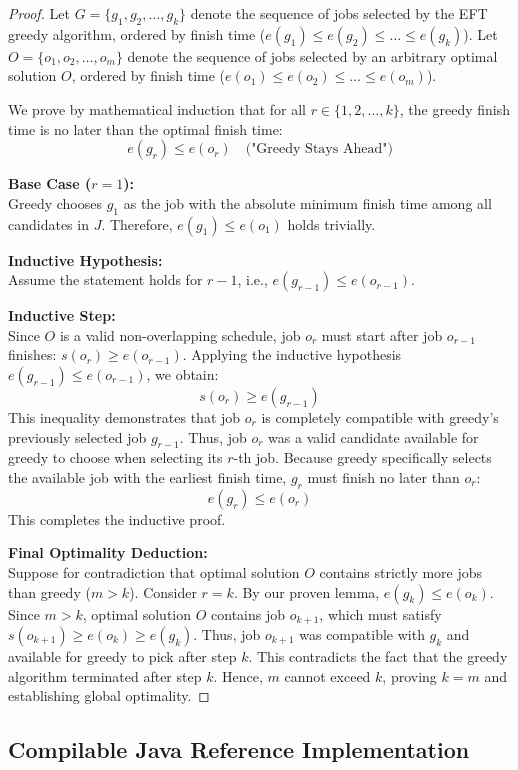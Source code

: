 \documentclass[10pt,journal,compsoc,onecolumn]{IEEEtran}
\begin{document}
\begin{proof}
Let $G = \{g_1, g_2, \dots, g_k\}$ denote the sequence of jobs selected by the EFT greedy algorithm, ordered by finish time ($e(g_1) \le e(g_2) \le \dots \le e(g_k)$).
Let $O = \{o_1, o_2, \dots, o_m\}$ denote the sequence of jobs selected by an arbitrary optimal solution $O$, ordered by finish time ($e(o_1) \le e(o_2) \le \dots \le e(o_m)$).

We prove by mathematical induction that for all $r \in \{1, 2, \dots, k\}$, the greedy finish time is no later than the optimal finish time:
\[
e(g_r) \le e(o_r) \quad \text{("Greedy Stays Ahead")}
\]

\textbf{Base Case ($r = 1$):} \\
Greedy chooses $g_1$ as the job with the absolute minimum finish time among all candidates in $J$. Therefore, $e(g_1) \le e(o_1)$ holds trivially.

\textbf{Inductive Hypothesis:} \\
Assume the statement holds for $r - 1$, i.e., $e(g_{r-1}) \le e(o_{r-1})$.

\textbf{Inductive Step:} \\
Since $O$ is a valid non-overlapping schedule, job $o_r$ must start after job $o_{r-1}$ finishes: $s(o_r) \ge e(o_{r-1})$.
Applying the inductive hypothesis $e(g_{r-1}) \le e(o_{r-1})$, we obtain:
\[
s(o_r) \ge e(g_{r-1})
\]
This inequality demonstrates that job $o_r$ is completely compatible with greedy's previously selected job $g_{r-1}$. Thus, job $o_r$ was a valid candidate available for greedy to choose when selecting its $r$-th job. Because greedy specifically selects the available job with the earliest finish time, $g_r$ must finish no later than $o_r$:
\[
e(g_r) \le e(o_r)
\]
This completes the inductive proof.

\textbf{Final Optimality Deduction:} \\
Suppose for contradiction that optimal solution $O$ contains strictly more jobs than greedy ($m > k$). Consider $r = k$. By our proven lemma, $e(g_k) \le e(o_k)$. Since $m > k$, optimal solution $O$ contains job $o_{k+1}$, which must satisfy $s(o_{k+1}) \ge e(o_k) \ge e(g_k)$.
Thus, job $o_{k+1}$ was compatible with $g_k$ and available for greedy to pick after step $k$. This contradicts the fact that the greedy algorithm terminated after step $k$. Hence, $m$ cannot exceed $k$, proving $k = m$ and establishing global optimality.
\end{proof}

\subsection{Compilable Java Reference Implementation}
\end{document}
